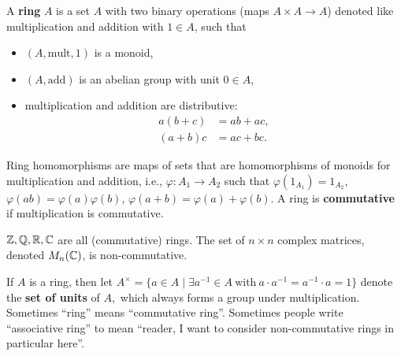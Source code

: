 \begin{definition}[]
    A \textbf{ring} $A$ is a set $A$ with two binary operations (maps $A \times A \to A$) denoted like multiplication and addition
    with $1 \in A$, such that 
    \begin{itemize}
    \setlength\itemsep{-.2em}
\item $(A, \text{mult} ,1) $ is a monoid,
\item $(A, \text{add} )$ is an abelian group with unit $0 \in A$,
\item multiplication and addition are distributive: 
    \begin{align*}
        a(b+c)&=ab+ac, \\
        (a+b)c&=ac+bc.
    \end{align*}
    \end{itemize}
    Ring homomorphisms are maps of sets that are homomorphisms of monoids for multiplication and addition, i.e., $\varphi  \colon A_1 \to A_2$ such that $\varphi (1_{A_1})=1_{A_2}$, $\varphi (ab)=\varphi (a)\varphi (b)$, $\varphi (a+b)=\varphi (a)+\varphi (b)$. A ring is \textbf{commutative} if multiplication is commutative.
\end{definition}
\begin{example}
    $\mathbb{Z},\mathbb{Q},\mathbb{R},\mathbb{C}$ are all (commutative) rings. The set of $n \times  n$ complex matrices, denoted $M_n (\mathbb{C})$, is non-commutative.
\end{example}
If $A$ is a ring, then let $A^{\times }= \{a \in A \mid  \exists a ^{-1} \in A \ \text{with} \ a \cdot a ^{-1} = a ^{-1} \cdot  a=1\} $ denote the \textbf{set of units} of $A,$ which always forms a group under multiplication. Sometimes ``ring'' means ``commutative ring''. Sometimes people write ``associative ring'' to mean ``reader, I want to consider non-commutative rings in particular here''.

